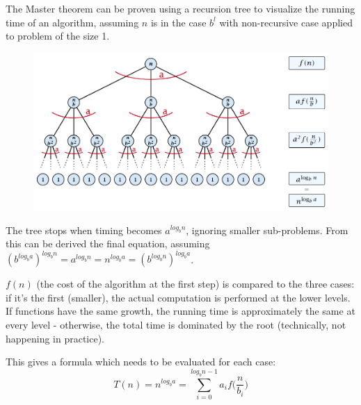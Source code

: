 The Master theorem can be proven using a recursion tree to visualize the running time of an algorithm, assuming $n$ is in the case $b^l$ with non-recursive case applied to problem of the size 1. 

\begin{figure}[h]
	\centering
	\includegraphics[scale=0.43]{lectures/images/master_tree.png}
\end{figure}

The tree stops when timing becomes $a^{log_bn}$, ignoring smaller sub-problems. From this can be derived the final equation, assuming $(b^{log_ba})^{log_bn} = a^{log_bn} = n^{log_ba} = (b^{log_bn})^{log_ba}$.

$f(n)$ (the cost of the algorithm at the first step) is compared to the three cases: if it's the first (smaller), the actual computation is performed at the lower levels. If functions have the same growth, the running time is approximately the same at every level - otherwise, the total time is dominated by the root (technically, not happening in practice). 

This gives a formula which needs to be evaluated for each case: 
$$T(n) = n^{log_ba} = \sum_{i=0}^{log_bn-1}a_if \Big( \frac{n}{b_i} \Big)$$



